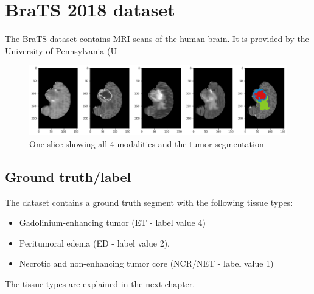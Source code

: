 \section{BraTS 2018 dataset}
The BraTS dataset \cite{menze2015multimodal} contains MRI scans of the human brain. It is provided by the University of Pennsylvania (U

\begin{figure}[H]
\centering
\includegraphics[width=14cm]{chapters/04_segmentation/images/brats.png}
\caption{One slice showing all 4 modalities and the tumor segmentation}
\end{figure}

\subsection{Ground truth/label}
The dataset contains a ground truth segment with the following tissue types:

\begin{itemize}
    \item Gadolinium-enhancing tumor (ET - label value 4)
    \item Peritumoral edema (ED - label value 2),
    \item Necrotic and non-enhancing tumor core (NCR/NET - label value 1)
\end{itemize}

The tissue types are explained in the next chapter.
